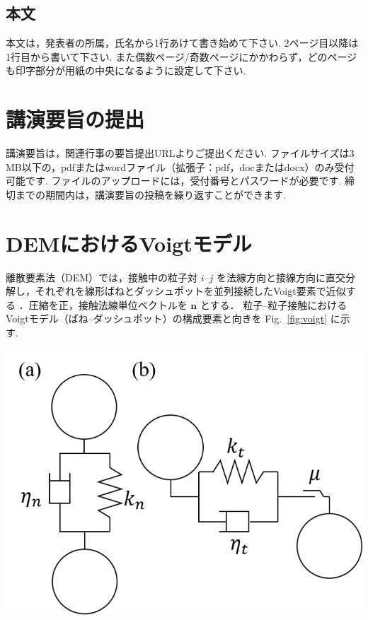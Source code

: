 \documentclass[a4paper,10pt,twocolumn]{ltjsarticle}
\newcommand{\refFig}[1]{Fig.~\ref{#1}}
\begin{document}
\subsection{本文}
本文は，発表者の所属，氏名から1行あけて書き始めて下さい. 2ページ目以降は1行目から書いて下さい. また偶数ページ/奇数ページにかかわらず，どのページも印字部分が用紙の中央になるように設定して下さい.

\par{}


\section{講演要旨の提出}
講演要旨は，関連行事の要旨提出URLよりご提出ください. ファイルサイズは3\,MB以下の，pdfまたはwordファイル（拡張子：pdf，docまたはdocx）のみ受付可能です. ファイルのアップロードには，受付番号とパスワードが必要です. 締切までの期間内は，講演要旨の投稿を繰り返すことができます.

\par{}


\section{DEMにおけるVoigtモデル}
離散要素法（DEM）では，接触中の粒子対 $i$–$j$ を法線方向と接線方向に直交分解し，それぞれを線形ばねとダッシュポットを並列接続したVoigt要素で近似する \cite{Cundall1979}．圧縮を正，接触法線単位ベクトルを $\bm n$ とする．
粒子–粒子接触におけるVoigtモデル（ばね–ダッシュポット）の構成要素と向きを \refFig{fig:voigt} に示す.

\noindent\begin{minipage}{\columnwidth}\centering
  \includegraphics[width=\columnwidth]{voigt_model}
  \label{fig:voigt}
\end{minipage}
\end{document}
